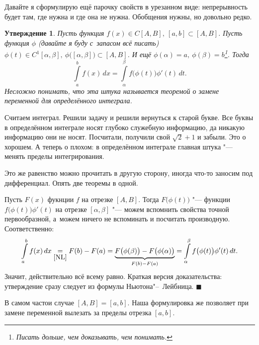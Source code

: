 \documentclass[a4paper,10pt,twoside]{article}
\newtheorem{Ut}{Утверждение}[section]
\newenvironment{Zam}
     	{\par\noindent{\textbf{Замечание.}}}{}
\newenvironment{Proof}
       {\par\noindent{\textbf{Доказательство.}}}
       {\hfill$\scriptstyle\blacksquare$}
\begin{document}
    Давайте я сформулирую ещё парочку свойств в урезанном виде: непрерывность будет там, где нужна и где она не нужна. Обобщения нужны, но довольно редко.
    
    \begin{Ut}
    	Пусть функция $f(x)\in C[A,B],\ [a,b]\subset[A,B]$. Пусть функция $\phi$ (давайте я буду с~запасом всё писать) $\phi(t)\in C^1[\alpha,\beta],\ \phi\big([\alpha,\beta]\big)\subset[A,B]$.
    	И ещё $\phi(\alpha)=a,\ \phi(\beta)=b$\footnote{Писать дольше, чем доказывать, чем понимать.}.
    	Тогда
    	$$\int\limits_a^bf(x)\,dx=\int\limits_\alpha^\beta f\big(\phi(t)\big)\phi'(t)\,dt.$$
    	Несложно понимать, что эта штука называется теоремой о замене переменной для определённого интеграла.
    \end{Ut}
    
    Считаем интеграл. Решили задачу и решили вернуться к старой букве. Все буквы в определённом интеграле носят глубоко служебную информацию,
    да никакую информацию они не носят. Посчитали, получили свой $\sqrt2 +1$ и забыли. Это о хорошем. А теперь о плохом: в определённом интеграле
    главная штука "--- менять пределы интегрирования.
    
    Это же равенство можно прочитать в другую сторону, иногда что-то заносим под дифференциал. Опять две теоремы в одной.
    
    \begin{Proof}
    	Пусть $F(x)$ \tp{} фукнции $f$ на отрезке $[A,B]$. Тогда $F\big(\phi(t)\big)$ "--- \tp{} функции $f\big(\phi(t)\big)\phi'(t)$ на 
    	отрезке $[\alpha,\beta]$ "--- можем вспомнить свойства точной первообразной, а~можем ничего не вспоминать и посчитать производную.
    	Соответственно:
    	$$\int\limits_a^bf(x)\,dx\underset{\ref{NL}}{=}F(b)-F(a)=\underbrace{F\big(\phi(\beta)\big)-F\big(\phi(\alpha)\big)}_{F(b)-F(a)}=\int\limits_{\alpha}^\beta f\big(\phi(t)\big)\phi'(t)\,dt.$$
    	Значит, действительно всё всему равно. Краткая версия доказательства: утверждение сразу следует из формулы Ньютона"--~Лейбница.
    \end{Proof}
    
    \begin{Zam}
    	В самом частои случае $[A,B]=[a,b]$. Наша формулировка же позволяет при замене переменной вылезать за пределы отрезка $[a,b]$.
    \end{Zam}
    
\end{document}
